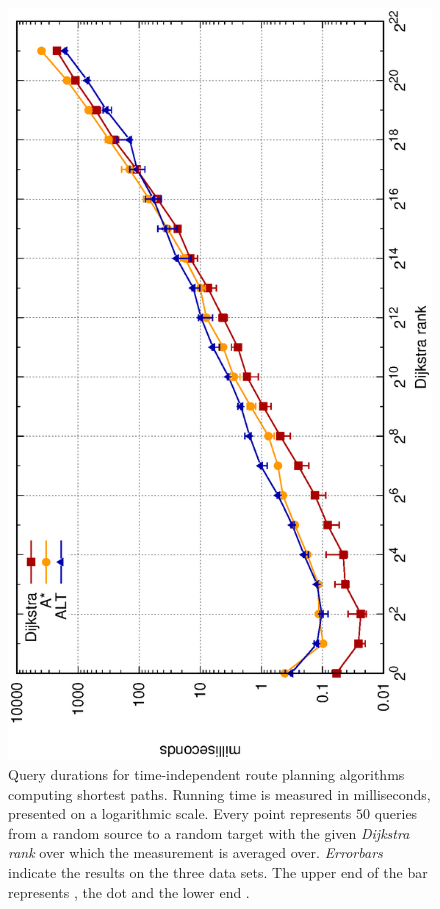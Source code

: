 	\begin{figure}[!ht]
		 \begin{center}
			\includegraphics[scale=0.55,angle=-90]{res/plots/uniModalTimeIndependentResults}
		\end{center}
		\caption{Query durations for \uniModal time-independent route planning algorithms computing shortest paths.
			Running time is measured in milliseconds, presented on a logarithmic scale.
			Every point represents $50$ queries from a random source to a random target with the given \textit{Dijkstra rank}
			over which the measurement is averaged over. \textit{Errorbars} indicate the results on the three data sets.
			The upper end of the bar represents \switzerlandR, the dot \stuttgartR and the lower end \freiburgR.}
		\label{uniModalTimeIndependentResults}
	\end{figure}\quad\\
